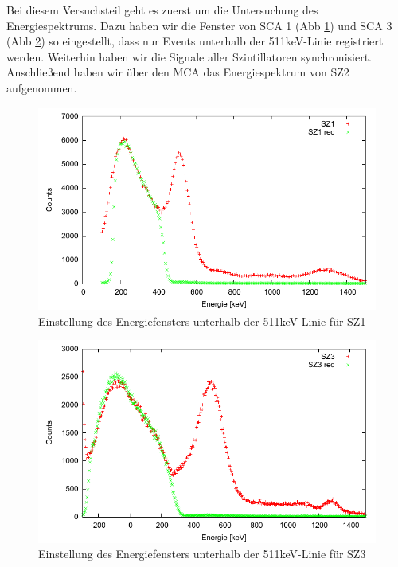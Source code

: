Bei diesem Versuchsteil geht es zuerst um die Untersuchung des Energiespektrums. Dazu haben wir die Fenster von SCA 1 (Abb \ref{graphen-3er-red-spektrum-sz1}) und SCA 3 (Abb \ref{graphen-3er-red-spektrum-sz3}) so eingestellt, dass nur Events unterhalb der 511keV-Linie registriert werden. Weiterhin haben wir die Signale aller Szintillatoren synchronisiert. Anschließend haben wir über den MCA das Energiespektrum von SZ2 aufgenommen. 
\begin{figure}
 \includegraphics[width=\textwidth]{Graphen/3er/red-spektrum-sz1.pdf}
 \caption{Einstellung des Energiefensters unterhalb der 511keV-Linie für SZ1}
 \label{graphen-3er-red-spektrum-sz1}
\end{figure}


\begin{figure}
 \includegraphics[width=\textwidth]{Graphen/3er/red-spektrum-sz3.pdf}
 \caption{Einstellung des Energiefensters unterhalb der 511keV-Linie für SZ3}
 \label{graphen-3er-red-spektrum-sz3}
\end{figure}

